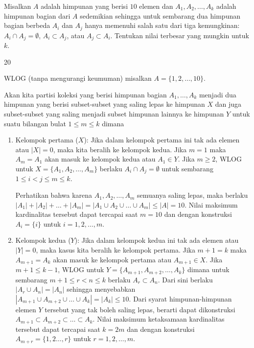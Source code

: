 \documentclass[12pt]{scrartcl}
\begin{document}
	\begin{soalbaru}
		Misalkan $A$ adalah himpunan yang berisi $10$ elemen dan $A_1,A_2,\dots,A_k$ adalah himpunan bagian dari $A$ sedemikian sehingga untuk sembarang dua himpunan bagian berbeda $A_i$ dan $A_j$ hanya memenuhi salah satu dari tiga kemungkinan: $A_i \cap A_j = \emptyset$, $A_i \subset A_j$, atau $A_j \subset A_i$. Tentukan nilai terbesar yang mungkin untuk $k$.\\[-20pt] %
		
		\begin{jawaban}
		20
		\end{jawaban}
		\begin{solusi}
		WLOG (tanpa mengurangi keumuman) misalkan $A=\{1,2,\dots,10\}$.
		
		Akan kita partisi koleksi yang berisi himpunan bagian  $A_1,\dots,A_k$ menjadi dua himpunan yang berisi subset-subset yang saling lepas ke himpunan $X$ dan juga subset-subset yang saling menjadi subset himpunan lainnya ke himpunan $Y$ untuk suatu bilangan bulat $1\le m \le k$ dimana
		
		\begin{enumerate}
		\item 	Kelompok pertama ($X$):
		Jika dalam kelompok pertama ini tak ada elemen atau $|X|=0$, maka kita beralih ke kelompok kedua. Jika $m = 1$ maka $A_m = A_1$ akan masuk ke kelompok kedua atau $A_1 \in Y$. 
		 Jika $m \ge 2$, WLOG untuk $X=\{A_1,A_2,\dots,A_m\}$ berlaku $A_i \cap A_j = \emptyset$ untuk sembarang $1 \le i < j \le m \le k$. 
		 
		 Perhatikan bahwa karena $A_1,A_2,\dots,A_m$ semuanya saling lepas, maka berlaku\\ $ |A_1|+|A_2|+\dots+|A_m| = |A_1 \cup A_2 \cup \dots \cup A_m| \le |A| = 10$. 
		 Nilai maksimum kardinalitas tersebut dapat tercapai saat $m=10$ dan dengan konstruksi $A_i = \{i\}$ untuk $i=1,2,\dots,m$.
				
		\item Kelompok kedua ($Y$):
		Jika dalam kelompok kedua ini tak ada elemen atau $|Y|=0$, maka kasus kita beralih ke kelompok pertama. Jika $m+1 = k$ maka $A_{m+1} = A_k$ akan masuk ke kelompok pertama atau $A_{m+1} \in X$.
		Jika $m+1 \le k-1$, WLOG untuk $Y=\{A_{m+1},A_{m+2},\dots,A_{k}\}$ dimana untuk sembarang $m+1 \le r < n \le k$ berlaku $A_{r} \subset A_{n}$. Dari sini berlaku $|A_{r} \cup A_n| = |A_n|$ sehingga menyebabkan $|A_{m+1}\cup A_{m+2}\cup\dots\cup A_{k}|=|A_{k}| \le 10$. Dari syarat himpunan-himpunan elemen $Y$ tersebut yang tak boleh saling lepas, berarti dapat dikonstruksi $A_{m+1} \subset A_{m+2} \subset \dots \subset A_k$. Nilai maksimum ketaksamaan kardinalitas tersebut dapat tercapai saat $k=2m$ dan dengan konstruksi $A_{m+r} = \{1,2\dots,r\}$ untuk $r=1,2,\dots,m$.
		\end{enumerate}
		

\end{solusi}
\end{soalbaru}
\end{document}

